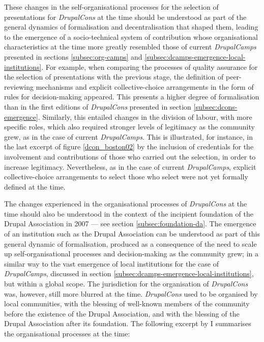 These changes in the self-organisational processes for the selection of presentations for \textit{DrupalCons} at the time should be understood as part of the general dynamics of formalisation and decentralisation that shaped them, leading to the emergence of a socio-technical system of contribution whose organisational characteristics at the time more greatly resembled those of current \textit{DrupalCamps} presented in sections \ref{subsec:org-camps} and \ref{subsec:dcamps-emergence-local-institutions}. For example, when comparing the processes of quality assurance for the selection of presentations with the previous stage, the definition of peer-reviewing mechanisms and explicit collective-choice arrangements in the form of rules for decision-making appeared. This presents a higher degree of formalisation than in the first editions of \textit{DrupalCons} presented in section \ref{subsec:dcons-emergence}. Similarly, this entailed changes in the division of labour, with more specific roles, which also required stronger levels of legitimacy as the community grew, as in the case of current \textit{DrupalCamps}. This is illustrated, for instance, in the last excerpt of figure \ref{dcon_boston02} by the inclusion of credentials for the involvement and contributions of those who carried out the selection, in order to increase legitimacy. Nevertheless, as in the case of current \textit{DrupalCamps}, explicit collective-choice arrangements to select those who select were not yet formally defined at the time.

The changes experienced in the organisational processes of \textit{DrupalCons} at the time should also be understood in the context of the incipient foundation of the Drupal Association in 2007 --- see section \ref{subsec:foundation-da}. The emergence of an institution such as the Drupal Association can be understood as part of this general dynamic of formalisation, produced as a consequence of the need to scale up self-organisational processes and decision-making as the community grew; in a similar way to the vast emergence of local institutions for the case of \textit{DrupalCamps}, discussed in section \ref{subsec:dcamps-emergence-local-institutions}, but within a global scope. The jurisdiction for the organisation of \textit{DrupalCons} was, however, still more blurred at the time. \textit{DrupalCons} used to be organised by local communities, with the blessing of well-known members of the community before the existence of the Drupal Association, and with the blessing of the Drupal Association after its foundation. The following excerpt by I summarises the organisational processes at the time:

